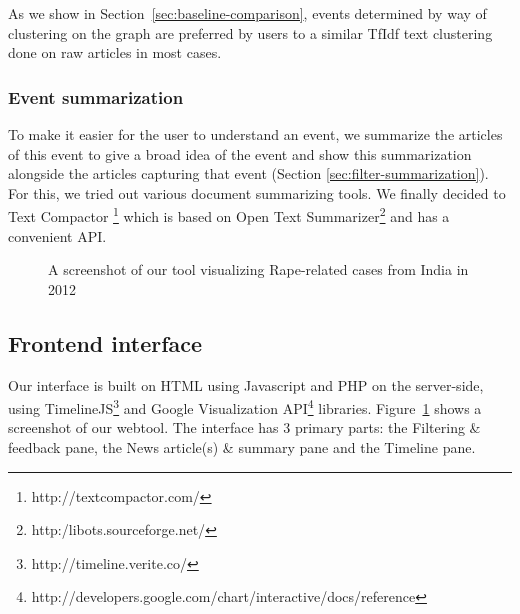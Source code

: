 As we show in Section~\ref{sec:baseline-comparison}, events determined by way of clustering on the graph are preferred by users to a similar TfIdf text clustering done on raw articles in most cases.

\subsubsection*{Event summarization}
To make it easier for the user to understand an event, we summarize the articles of this event to give a broad idea of the event and show this summarization alongside the articles capturing that event (Section \ref{sec:filter-summarization}). For this, we tried out various document summarizing tools. We finally decided to Text Compactor \footnote{http://textcompactor.com/} which is based on Open Text Summarizer\footnote{http:/libots.sourceforge.net/} and has a convenient API. 
\begin{figure}[ht]
\caption{A screenshot of our tool visualizing Rape-related cases from India in 2012}
\label{fig:complete-tool-screenshot}
\end{figure}
\subsection {Frontend interface}
Our interface is built on HTML using Javascript and PHP on the server-side, using TimelineJS\footnote{http://timeline.verite.co/} and Google Visualization API\footnote{http://developers.google.com/chart/interactive/docs/reference} libraries.
Figure~\ref{fig:complete-tool-screenshot} shows a screenshot of our webtool. The interface
has 3 primary parts: the Filtering \& feedback pane, the News article(s) \& summary pane and the Timeline pane. 
